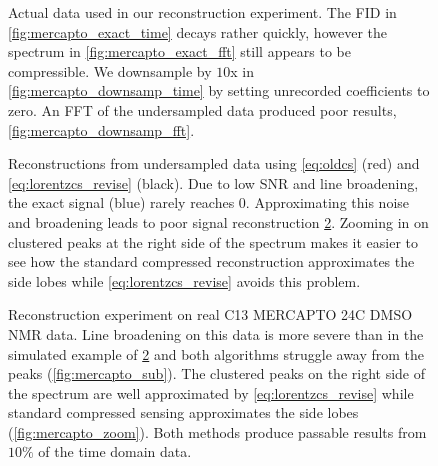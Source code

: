\documentclass[11pt]{article}
\begin{document}
\begin{figure}
\centering
{}
\qquad
{}
\qquad
{}
\qquad
{}
\qquad
\caption{Actual data used in our reconstruction experiment. The FID in \cref{fig:mercapto_exact_time} decays rather quickly, however the spectrum in \cref{fig:mercapto_exact_fft} still appears to be compressible. We downsample by $10$x in \cref{fig:mercapto_downsamp_time} by setting unrecorded coefficients to zero. An FFT of the undersampled data produced poor results, \cref{fig:mercapto_downsamp_fft}.}
\label{fig:real_data}
\end{figure}

\begin{figure}
\centering
{}
\qquad
{}
\qquad
\caption{Reconstructions from undersampled data using \cref{eq:oldcs} (red) and \cref{eq:lorentzcs_revise} (black). Due to low SNR and line broadening, the exact signal (blue) rarely reaches $0$. Approximating this noise and broadening leads to poor signal reconstruction \cref{fig:fourpeaks}. Zooming in on clustered peaks at the right side of the spectrum makes it easier to see how the standard compressed reconstruction approximates the side lobes while \cref{eq:lorentzcs_revise} avoids this problem.}
\label{fig:fourpeaks}
\end{figure}

\begin{figure}
\centering
{}
\qquad
{}
\caption{Reconstruction experiment on real C13 MERCAPTO 24C DMSO NMR data. Line broadening on this data is more severe than in the simulated example of \cref{fig:fourpeaks} and both algorithms struggle away from the peaks (\cref{fig:mercapto_sub}). The clustered peaks on the right side of the spectrum are well approximated by \cref{eq:lorentzcs_revise} while standard compressed sensing approximates the side lobes (\cref{fig:mercapto_zoom}). Both methods produce passable results from $10\%$ of the time domain data.}
\label{fig:mercapto}
\end{figure}
\end{document}
